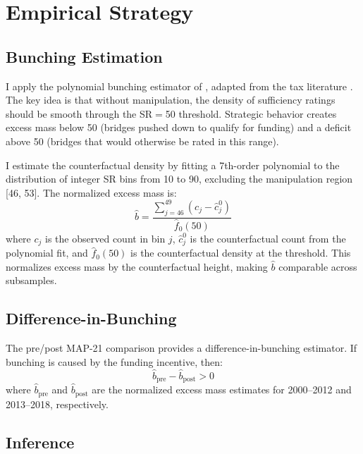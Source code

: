 \documentclass[12pt]{article}
\begin{document}
\section{Empirical Strategy}

\subsection{Bunching Estimation}

I apply the polynomial bunching estimator of \citet{kleven2016bunching}, adapted from the tax literature \citep{saez2010taxpayers, chetty2011adjustment}. The key idea is that without manipulation, the density of sufficiency ratings should be smooth through the SR$=$50 threshold. Strategic behavior creates excess mass below 50 (bridges pushed down to qualify for funding) and a deficit above 50 (bridges that would otherwise be rated in this range).

I estimate the counterfactual density by fitting a 7th-order polynomial to the distribution of integer SR bins from 10 to 90, excluding the manipulation region [46, 53]. The normalized excess mass is:
\begin{equation}
\hat{b} = \frac{\sum_{j=46}^{49} (c_j - \hat{c}_j^0)}{\hat{f}_0(50)}
\end{equation}
where $c_j$ is the observed count in bin $j$, $\hat{c}_j^0$ is the counterfactual count from the polynomial fit, and $\hat{f}_0(50)$ is the counterfactual density at the threshold. This normalizes excess mass by the counterfactual height, making $\hat{b}$ comparable across subsamples.

\subsection{Difference-in-Bunching}

The pre/post MAP-21 comparison provides a difference-in-bunching estimator. If bunching is caused by the funding incentive, then:
\begin{equation}
\hat{b}_{\text{pre}} - \hat{b}_{\text{post}} > 0
\end{equation}
where $\hat{b}_{\text{pre}}$ and $\hat{b}_{\text{post}}$ are the normalized excess mass estimates for 2000--2012 and 2013--2018, respectively.

\subsection{Inference}
\end{document}
